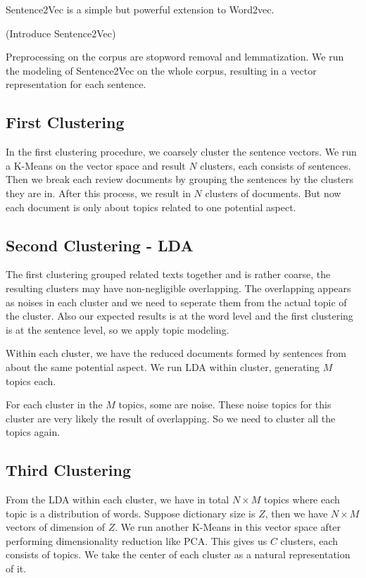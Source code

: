 Sentence2Vec is a simple but powerful extension to Word2vec.

(Introduce Sentence2Vec)

Preprocessing on the corpus are stopword removal and lemmatization.
We run the modeling of Sentence2Vec on the whole corpus, resulting in a vector representation for each sentence.

\subsection{First Clustering}
In the first clustering procedure, we coarsely cluster the sentence vectors. We run a K-Means on the vector space and result $N$ clusters, each consists of sentences. Then we break each review documents by grouping the sentences by the clusters they are in. After this process, we result in $N$ clusters of documents. But now each document is only about topics related to one potential aspect.

\subsection{Second Clustering - LDA}
The first clustering grouped related texts together and is rather coarse, the resulting clusters may have non-negligible overlapping. The overlapping appears as noises in each cluster and we need to seperate them from the actual topic of the cluster. Also our expected results is at the word level and the first clustering is at the sentence level, so we apply topic modeling. 

Within each cluster, we have the reduced documents formed by sentences from about the same potential aspect. We run LDA within cluster, generating $M$ topics each. 

For each cluster in the $M$ topics, some are noise. These noise topics for this cluster are very likely the result of overlapping. So we need to cluster all the topics again.

\subsection{Third Clustering}
From the LDA within each cluster, we have in total $N\times M$ topics where each topic is a distribution of words. Suppose dictionary size is $Z$, then we have $N\times M$ vectors of dimension of $Z$. We run another K-Means in this vector space after performing dimensionality reduction like PCA. This gives us $C$ clusters, each consists of topics. We take the center of each cluster as a natural representation of it. 

